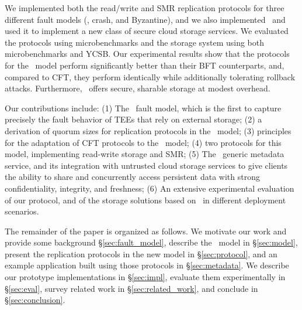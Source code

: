 

We implemented both the read/write and SMR replication protocols for
three different fault models (\faultmodel, crash, and Byzantine), and
we also implemented \sys\ and used it to implement a new class of
secure cloud storage services. We evaluated the protocols using
microbenchmarks and the storage system using both microbenchmarks and
YCSB.  Our experimental results show that the protocols for the
\faultmodel\ model perform significantly better than their BFT
counterparts, and, compared to CFT, they perform identically while
additionally tolerating rollback attacks.
Furthermore, \sys\ offers secure, sharable storage at modest overhead.

Our contributions include:
 (1) The \faultmodel\ fault model, which is the first to capture
precisely the fault behavior of \acp{TEE} that rely on external storage;
(2) a derivation of quorum sizes for replication protocols in the
\faultmodel\ model;
(3) principles for the adaptation of CFT protocols to
the \faultmodel\ model;
(4) two protocols for this model, implementing read-write storage and
SMR;
(5) The \sys\ generic metadata service, and its integration with
untrusted cloud storage services to give clients the ability to share
and concurrently access persistent data with strong confidentiality,
integrity, and freshness;
(6) An extensive experimental evaluation of our protocol, and of the
storage solutions based on \sys\ in different deployment scenarios.


The remainder of the paper is organized as follows.  We motivate
our work and provide some background \S\ref{sec:fault_model},
describe the \faultmodel\ model in \S\ref{sec:model}, present the
replication protocols in the new model in
\S\ref{sec:protocol}, and an example application built using
those protocols in \S\ref{sec:metadata}.  We describe our
prototype implementations in \S\ref{sec:impl}, evaluate them
experimentally in \S\ref{sec:eval}, survey related work in
\S\ref{sec:related_work}, and conclude in \S\ref{sec:conclusion}.





\fi
